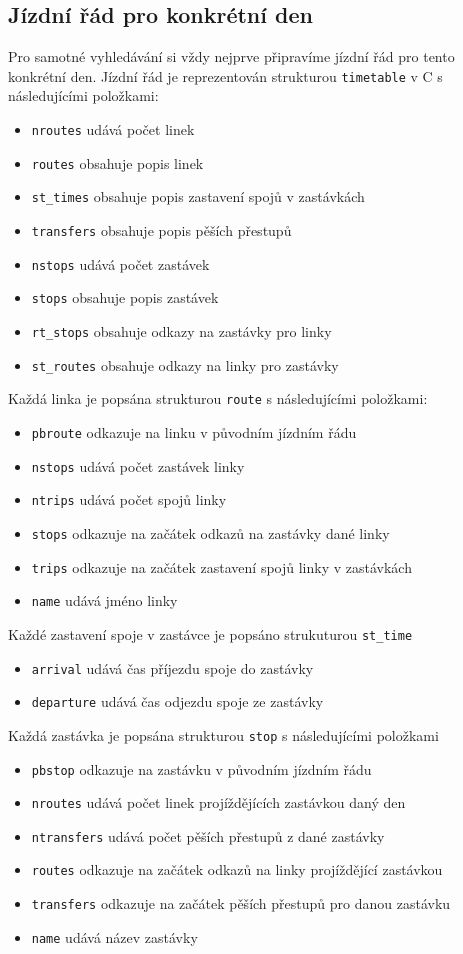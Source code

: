 \subsection{Jízdní řád pro konkrétní den}
Pro samotné vyhledávání si vždy nejprve připravíme jízdní řád pro tento
konkrétní den. Jízdní řád je reprezentován strukturou {\tt timetable} v C s následujícími
položkami:
\begin{itemize}
	\item {\tt nroutes} udává počet linek
	\item {\tt routes} obsahuje popis linek
	\item {\tt st\_times} obsahuje popis zastavení spojů v zastávkách
	\item {\tt transfers} obsahuje popis pěších přestupů
	\item {\tt nstops} udává počet zastávek
	\item {\tt stops} obsahuje popis zastávek
	\item {\tt rt\_stops} obsahuje odkazy na zastávky pro linky 
	\item {\tt st\_routes} obsahuje odkazy na linky pro zastávky
\end{itemize}
Každá linka je popsána strukturou {\tt route} s následujícími položkami:
\begin{itemize}
	\item {\tt pbroute} odkazuje na linku v původním jízdním řádu
	\item {\tt nstops} udává počet zastávek linky
	\item {\tt ntrips} udává počet spojů linky
	\item {\tt stops} odkazuje na začátek odkazů na zastávky dané linky
	\item {\tt trips} odkazuje na začátek zastavení spojů linky v zastávkách 
	\item {\tt name} udává jméno linky
\end{itemize}
Každé zastavení spoje v zastávce je popsáno strukuturou {\tt st\_time}
\begin{itemize}
	\item {\tt arrival} udává čas příjezdu spoje do zastávky
	\item {\tt departure} udává čas odjezdu spoje ze zastávky
\end{itemize}
Každá zastávka je popsána strukturou {\tt stop} s následujícími položkami
\begin{itemize}
	\item {\tt pbstop} odkazuje na zastávku v původním jízdním řádu
	\item {\tt nroutes} udává počet linek projíždějících zastávkou daný den
	\item {\tt ntransfers} udává počet pěších přestupů z dané zastávky
	\item {\tt routes} odkazuje na začátek odkazů na linky projíždějící
	zastávkou 
	\item {\tt transfers} odkazuje na začátek pěších přestupů pro danou
	zastávku
	\item {\tt name} udává název zastávky
\end{itemize}
